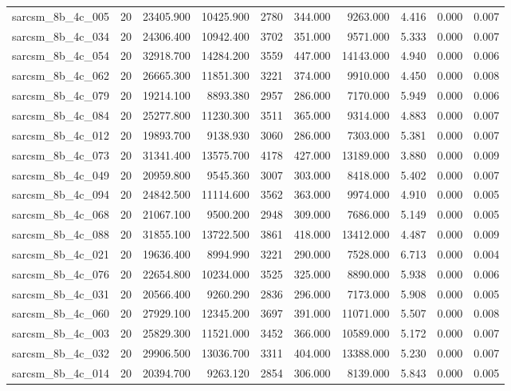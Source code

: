 \begin{tabular}{lrrrrrrrrr}
sarcsm\_8b\_4c\_005 & 20 & 23405.900 & 10425.900 & 2780 & 344.000 & 9263.000 & 4.416 & 0.000 & 0.007 \\
sarcsm\_8b\_4c\_034 & 20 & 24306.400 & 10942.400 & 3702 & 351.000 & 9571.000 & 5.333 & 0.000 & 0.007 \\
sarcsm\_8b\_4c\_054 & 20 & 32918.700 & 14284.200 & 3559 & 447.000 & 14143.000 & 4.940 & 0.000 & 0.006 \\
sarcsm\_8b\_4c\_062 & 20 & 26665.300 & 11851.300 & 3221 & 374.000 & 9910.000 & 4.450 & 0.000 & 0.008 \\
sarcsm\_8b\_4c\_079 & 20 & 19214.100 & 8893.380 & 2957 & 286.000 & 7170.000 & 5.949 & 0.000 & 0.006 \\
sarcsm\_8b\_4c\_084 & 20 & 25277.800 & 11230.300 & 3511 & 365.000 & 9314.000 & 4.883 & 0.000 & 0.007 \\
sarcsm\_8b\_4c\_012 & 20 & 19893.700 & 9138.930 & 3060 & 286.000 & 7303.000 & 5.381 & 0.000 & 0.007 \\
sarcsm\_8b\_4c\_073 & 20 & 31341.400 & 13575.700 & 4178 & 427.000 & 13189.000 & 3.880 & 0.000 & 0.009 \\
sarcsm\_8b\_4c\_049 & 20 & 20959.800 & 9545.360 & 3007 & 303.000 & 8418.000 & 5.402 & 0.000 & 0.007 \\
sarcsm\_8b\_4c\_094 & 20 & 24842.500 & 11114.600 & 3562 & 363.000 & 9974.000 & 4.910 & 0.000 & 0.005 \\
sarcsm\_8b\_4c\_068 & 20 & 21067.100 & 9500.200 & 2948 & 309.000 & 7686.000 & 5.149 & 0.000 & 0.005 \\
sarcsm\_8b\_4c\_088 & 20 & 31855.100 & 13722.500 & 3861 & 418.000 & 13412.000 & 4.487 & 0.000 & 0.009 \\
sarcsm\_8b\_4c\_021 & 20 & 19636.400 & 8994.990 & 3221 & 290.000 & 7528.000 & 6.713 & 0.000 & 0.004 \\
sarcsm\_8b\_4c\_076 & 20 & 22654.800 & 10234.000 & 3525 & 325.000 & 8890.000 & 5.938 & 0.000 & 0.006 \\
sarcsm\_8b\_4c\_031 & 20 & 20566.400 & 9260.290 & 2836 & 296.000 & 7173.000 & 5.908 & 0.000 & 0.005 \\
sarcsm\_8b\_4c\_060 & 20 & 27929.100 & 12345.200 & 3697 & 391.000 & 11071.000 & 5.507 & 0.000 & 0.008 \\
sarcsm\_8b\_4c\_003 & 20 & 25829.300 & 11521.000 & 3452 & 366.000 & 10589.000 & 5.172 & 0.000 & 0.007 \\
sarcsm\_8b\_4c\_032 & 20 & 29906.500 & 13036.700 & 3311 & 404.000 & 13388.000 & 5.230 & 0.000 & 0.007 \\
sarcsm\_8b\_4c\_014 & 20 & 20394.700 & 9263.120 & 2854 & 306.000 & 8139.000 & 5.843 & 0.000 & 0.005 \\

\end{tabular}
